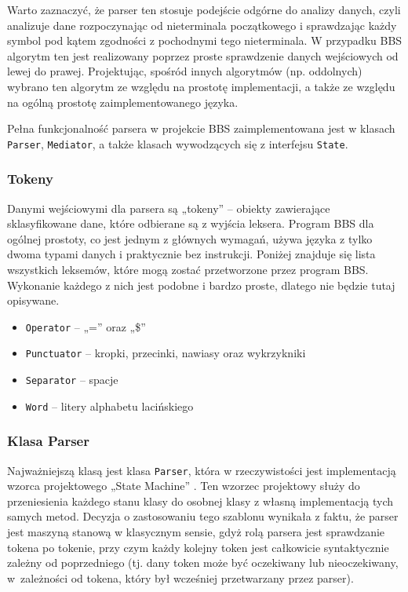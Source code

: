 Warto zaznaczyć, że parser ten stosuje podejście odgórne do analizy danych, czyli analizuje dane rozpoczynając od nieterminala początkowego i sprawdzając każdy symbol pod kątem zgodności z pochodnymi tego nieterminala. W przypadku BBS algorytm ten jest realizowany poprzez proste sprawdzenie danych wejściowych od lewej do prawej. Projektując, spośród innych algorytmów (np. oddolnych) wybrano ten algorytm ze względu na prostotę implementacji, a także ze względu na ogólną prostotę zaimplementowanego języka.

Pełna funkcjonalność parsera w projekcie BBS zaimplementowana jest w klasach \texttt{Parser}, \texttt{Mediator}, a także klasach wywodzących się z interfejsu \texttt{State}.

\subsubsection{Tokeny}

Danymi wejściowymi dla parsera są „tokeny” -- obiekty zawierające sklasyfikowane dane, które odbierane są z wyjścia leksera. Program BBS dla ogólnej prostoty, co jest jednym z głównych wymagań, używa języka z tylko dwoma typami danych i praktycznie bez instrukcji. Poniżej znajduje się lista wszystkich leksemów, które mogą zostać przetworzone przez program BBS. Wykonanie każdego z nich jest podobne i bardzo proste, dlatego nie będzie tutaj opisywane.

\begin{itemize}
	\item \texttt{Operator} -- „=” oraz „\$”
	\item \texttt{Punctuator} -- kropki, przecinki, nawiasy oraz wykrzykniki
	\item \texttt{Separator} -- spacje
	\item \texttt{Word} -- litery alphabetu lacińskiego
\end{itemize}

\subsubsection{Klasa Parser}

Najważniejszą klasą jest klasa \texttt{Parser}, która w rzeczywistości jest implementacją wzorca projektowego „State Machine” \cite{state}. Ten wzorzec projektowy służy do przeniesienia każdego stanu klasy do osobnej klasy z własną implementacją tych samych metod. Decyzja o zastosowaniu tego szablonu wynikała z faktu, że parser jest maszyną stanową w klasycznym sensie, gdyż rolą parsera jest sprawdzanie tokena po tokenie, przy czym każdy kolejny token jest całkowicie syntaktycznie zależny od poprzedniego (tj. dany token może być oczekiwany lub nieoczekiwany, w~zależności od tokena, który był wcześniej przetwarzany przez parser).

